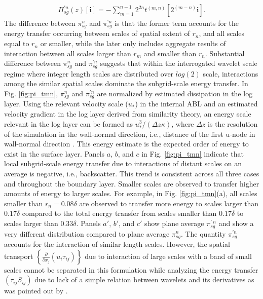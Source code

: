 \begin{align}
\Pi_{sg}^{\prime n}(z)[\mathbf{i}] = -\sum_{m=1}^{n-1}2^{2n}t^{(m,n)}[2^{(m-n)}\mathbf{i}].
\label{pi_tmn_1}
\end{align}
The difference between $\pi^{n}_{sg}$ and $\pi^{\prime n}_{sg}$ is that the former term accounts for the energy transfer occurring between scales of spatial extent of $r_n$, and all scales equal to $r_n$ or smaller, while the later only includes aggregate results of interaction between all scales larger than $r_m$ and smaller than $r_n$.  Substantial difference between $\pi^{n}_{sg}$ and $\pi^{\prime n}_{sg}$ suggests that within the interrogated wavelet scale regime where integer length scales are distributed over $log(2)$ scale, interactions among the similar spatial scales dominate the subgrid-scale energy transfer. In Fig. \ref{fig:pi_tmn}, $\pi^{n}_{sg}$ and $\pi^{\prime n}_{sg}$ are normalized by estimated dissipation in the log layer. Using the relevant velocity scale ($u_*$) in the internal ABL and an estimated velocity gradient in the log layer derived from similarity theory, an energy scale relevant in the log layer can be formed as $u^3_*/(\Delta z \kappa)$, where $\Delta z$ is the resolution of the simulation in the wall-normal direction, i.e., distance of the first u-node in wall-normal direction \citep{book-garrat-blm}. This energy estimate is the expected order of energy to exist in the surface layer. Panels $a$, $b$, and $c$ in Fig. \ref{fig:pi_tmn} indicate that local subgrid-scale energy transfer due to interactions of distant scales on an average is negative, i.e., backscatter. This trend is consistent across all three cases and throughout the boundary layer. Smaller scales are observed to transfer higher amounts of energy to larger scales. For example, in Fig. \ref{fig:pi_tmn}(a), all scales smaller than $r_n=0.08\delta$ are observed to transfer more energy to scales larger than $0.17\delta$ compared to the total energy transfer from scales smaller than $0.17\delta$ to scales larger than $0.33\delta$. Panels $a'$, $b'$, and $c'$ show plane average $\pi^{\prime \ n}_{sg}$ and show a very different distribution  compared to plane average $\pi^{n}_{sg}$. The quantity $\pi^{\prime n}_{sg}$ accounts for the interaction of similar length scales. However, the spatial transport $\left \{ \frac{\partial }{\partial x_j}(u_i\tau_{ij})\right \}$ due to interaction of large scales with a band of small scales cannot be separated in this formulation while analyzing the energy transfer $\left ( \tau_{ij}S_{ij} \right )$  due to lack of a simple relation between wavelets and its derivatives as was pointed out by \citet{meneveau_91jfm}.

